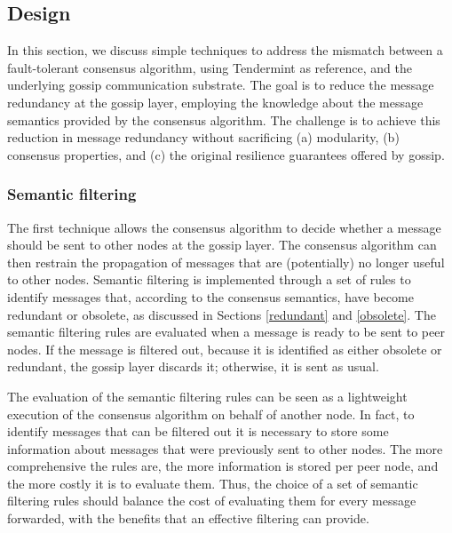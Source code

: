 \old

\subsection{Design}
\label{sec:design}

In this section, we discuss simple techniques to address the mismatch between a
fault-tolerant consensus algorithm, using Tendermint as reference, and the
underlying gossip communication substrate.
The goal is to reduce the message redundancy at the gossip layer,
employing the knowledge about the message semantics provided by the
consensus algorithm.
The challenge is to achieve this reduction in message redundancy without sacrificing
(a) modularity, (b) consensus properties, and (c) the original resilience guarantees offered by gossip. 

\subsubsection{Semantic filtering}

The first technique allows the consensus algorithm to decide whether a message should be sent to other nodes at the gossip layer.
The consensus algorithm can then restrain the propagation of messages that are (potentially) no longer useful to other nodes.
Semantic filtering is implemented through a set of rules to identify messages that, according to the consensus semantics, have become redundant or obsolete, as discussed in Sections \ref{redundant} and \ref{obsolete}.
%
The semantic filtering rules are evaluated when a message is ready to be sent to peer nodes.
If the message is filtered out, because it is identified as either obsolete or redundant, the gossip layer discards it; otherwise, it is sent as usual.

The evaluation of the semantic filtering rules can be seen as a lightweight
execution of the consensus algorithm on behalf of another node.
In fact, to identify messages that can be filtered out it is necessary to store
some information about messages that were previously sent to other nodes.
The more comprehensive the rules are, the more information is stored per peer node,
and the more costly it is to evaluate them.
Thus, the choice of a set of semantic filtering rules should balance the cost
of evaluating them for every message forwarded, with the benefits that an
effective filtering can provide.

